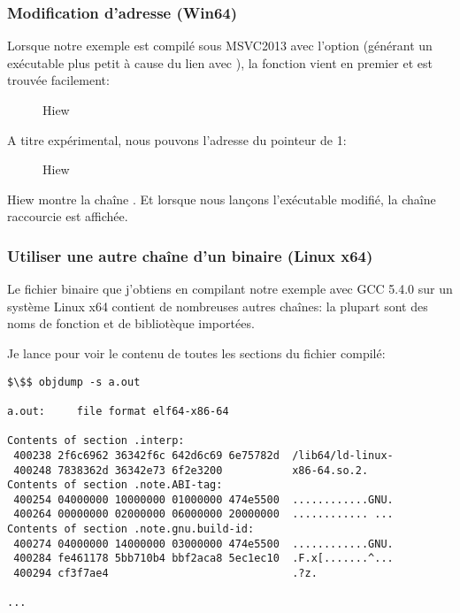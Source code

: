 \subsubsection{Modification d'adresse (Win64)}

Lorsque notre exemple est compilé sous MSVC2013 avec l'option 
(générant un exécutable plus petit à cause du lien avec ), la fonction \main vient en premier et
est trouvée facilement:

\begin{figure}[H]
\centering
{}
\caption{Hiew}
\label{}
\end{figure}

A titre expérimental, nous pouvons  l'adresse du pointeur de 1:

\begin{figure}[H]
\centering
{}
\caption{Hiew}
\label{}
\end{figure}

Hiew montre la chaîne .
Et lorsque nous lançons l'exécutable modifié, la chaîne raccourcie est affichée.

\subsubsection{Utiliser une autre chaîne d'un binaire (Linux x64)}

Le fichier binaire que j'obtiens en compilant notre exemple avec GCC 5.4.0 sur un système Linux x64 contient de
nombreuses autres chaînes:
la plupart sont des noms de fonction et de bibliotèque importées.

Je lance  pour voir le contenu de toutes les sections du fichier compilé:

\begin{lstlisting}[basicstyle=\ttfamily, mathescape]
$\$$ objdump -s a.out

a.out:     file format elf64-x86-64

Contents of section .interp:
 400238 2f6c6962 36342f6c 642d6c69 6e75782d  /lib64/ld-linux-
 400248 7838362d 36342e73 6f2e3200           x86-64.so.2.
Contents of section .note.ABI-tag:
 400254 04000000 10000000 01000000 474e5500  ............GNU.
 400264 00000000 02000000 06000000 20000000  ............ ...
Contents of section .note.gnu.build-id:
 400274 04000000 14000000 03000000 474e5500  ............GNU.
 400284 fe461178 5bb710b4 bbf2aca8 5ec1ec10  .F.x[.......^...
 400294 cf3f7ae4                             .?z.

...
\end{lstlisting}

